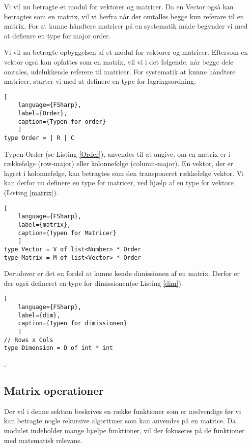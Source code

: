 Vi vil nu betragte et modul for vektorer og matricer. Da en Vector også kan betragtes som en matrix, vil vi herfra når der omtalles begge kun referare til en matrix. For at kunne håndtere matricer på en systematik måde begynder vi med at defienre en type for major order.

Vi vil nu betragte opbyggelsen af et modul for vektorer og matricer. Eftersom en vektor også kan opfattes som en matrix, vil vi i det følgende, når begge dele omtales, udelukkende referere til matricer. For systematik at kunne håndtere matricer, starter vi med at definere en type for lagringsordning.

\begin{lstlisting}[
    language={FSharp}, 
    label={Order}, 
    caption={Typen for order}
    ]
type Order = | R | C
\end{lstlisting}

Typen Order (se Listing \ref{Order}), anvendes til at angive, om en matrix er i rækkefølge (row-major) eller kolonnefølge (column-major). En vektor, der er lagret i kolonnefølge, kan betragtes som den transponeret rækkefølge vektor. Vi kan derfor nu definere en type for matricer, ved hjælp af en type for vektore (Listing \ref{matrix}).

\begin{lstlisting}[
    language={FSharp}, 
    label={matrix}, 
    caption={Typen for Matricer}
    ]
type Vector = V of list<Number> * Order
type Matrix = M of list<Vector> * Order
\end{lstlisting}

Derudover er det en fordel at kunne kende dimissionen af en matrix. Derfor er der også defineret en type for dimissionen(se Listing \ref{dim}).

\begin{lstlisting}[
    language={FSharp}, 
    label={dim}, 
    caption={Typen for dimissionen}
    ]
// Rows x Cols
type Dimension = D of int * int
\end{lstlisting}



.-\subsection{Matrix operationer}
Der vil i denne sektion beskrives en række funktioner som er nødvendige før vi kan betragte nogle rekursive algoritmer som kan anvendes på en matrice. Da modulet indeholder mange hjælpe funktioner, vil der fokuseres på de funktioner med matematisk relevans.

